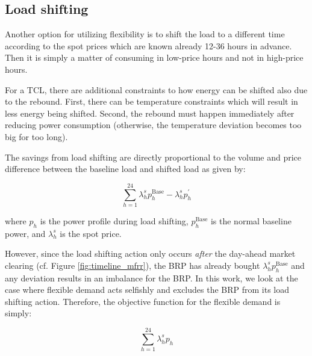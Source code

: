 \subsection{Load shifting}

Another option for utilizing flexibility is to shift the load to a different time according to the spot prices which are known already 12-36 hours in advance. Then it is simply a matter of consuming in low-price hours and not in high-price hours.

For a TCL, there are additional constraints to how energy can be shifted also due to the rebound. First, there can be temperature constraints which will result in less energy being shifted. Second, the rebound must happen immediately after reducing power consumption (otherwise, the temperature deviation becomes too big for too long).

The savings from load shifting are directly proportional to the volume and price difference between the baseline load and shifted load as given by:

\begin{equation}\label{eq:load_shifting_savings}
    \sum_{h=1}^{24} \lambda^{s}_{h} p^{\text{Base}}_{h} - \lambda^{s}_{h} p^{\prime}_{h}
\end{equation}

where $p_{h}$ is the power profile during load shifting, $p^{\text{Base}}_{h}$ is the normal baseline power, and $\lambda^{s}_{h}$ is the spot price.

However, since the load shifting action only occurs \textit{after} the day-ahead market clearing (cf. Figure \ref{fig:timeline_mfrr}), the BRP has already bought $\lambda^{s}_{h} p^{\text{Base}}_{h}$ and any deviation results in an imbalance for the BRP. In this work, we look at the case where flexible demand acts selfishly and excludes the BRP from its load shifting action. Therefore, the objective function for the flexible demand is simply:

\begin{equation}\label{eq:LoadShiftingObjective}
    \sum_{h=1}^{24} \lambda_{h}^{s} p_{h}
\end{equation}
